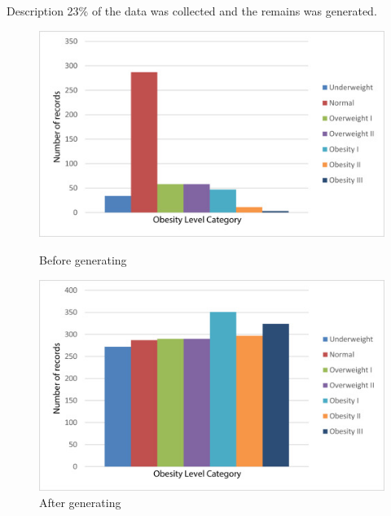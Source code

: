 \documentclass[11pt]{beamer}
\begin{document}
\begin{frame}{Description}
    23\% of the data was collected and the remains was generated.

\begin{figure}[!htb]
   \begin{minipage}{0.48\textwidth}
     \centering
     \includegraphics[width=1\linewidth]{images/rawdata.jpg}
     \caption{Before generating}\label{Fig:Data1}
   \end{minipage}\hfill
   \begin{minipage}{0.48\textwidth}
     \centering
     \includegraphics[width=1\linewidth]{images/balanced data.jpg}
     \caption{After generating}\label{Fig:Data2}
   \end{minipage}
\end{figure}


\end{frame}
\end{document}
